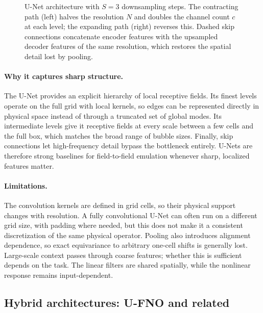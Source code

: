 \begin{figure}[!htbp]
  \centering
  \caption{U-Net architecture with $S=3$ downsampling steps. The contracting path (left) halves the resolution $N$ and doubles the channel count $c$ at each level; the expanding path (right) reverses this. Dashed skip connections concatenate encoder features with the upsampled decoder features of the same resolution, which restores the spatial detail lost by pooling.}
  \label{fig:unet}
\end{figure}

\paragraph{Why it captures sharp structure.} The U-Net provides an explicit hierarchy of local receptive fields. Its finest levels operate on the full grid with local kernels, so edges can be represented directly in physical space instead of through a truncated set of global modes. Its intermediate levels give it receptive fields at every scale between a few cells and the full box, which matches the broad range of bubble sizes. Finally, skip connections let high-frequency detail bypass the bottleneck entirely. U-Nets are therefore strong baselines for field-to-field emulation whenever sharp, localized features matter.

\paragraph{Limitations.} The convolution kernels are defined in grid cells, so their physical support changes with resolution. A fully convolutional U-Net can often run on a different grid size, with padding where needed, but this does not make it a consistent discretization of the same physical operator. Pooling also introduces alignment dependence, so exact equivariance to arbitrary one-cell shifts is generally lost. Large-scale context passes through coarse features; whether this is sufficient depends on the task. The linear filters are shared spatially, while the nonlinear response remains input-dependent.

\subsection{Hybrid architectures: U-FNO and related}
\label{sec:ufno}

